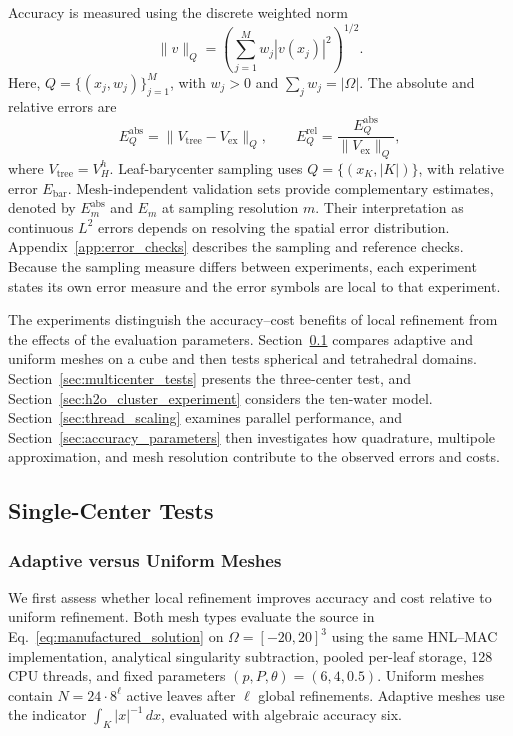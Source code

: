 \documentclass[a4paper,pdflatex,sn-mathphys-num]{sn-jnl}
\theoremstyle{thmstyleone}
\begin{document}
Accuracy is measured using the discrete weighted norm
\[
\|v\|_Q=\left(\sum_{j=1}^{M}w_j|v(x_j)|^2\right)^{1/2}.
\]
Here, $Q=\{(x_j,w_j)\}_{j=1}^{M}$, with $w_j>0$ and $\sum_jw_j=|\Omega|$. The absolute and relative errors are
\begin{equation}
\label{eq:sampled_error_measures}
E_Q^{\mathrm{abs}}=\|V_{\mathrm{tree}}-V_{\mathrm{ex}}\|_Q,
\qquad
E_Q^{\mathrm{rel}}=\frac{E_Q^{\mathrm{abs}}}{\|V_{\mathrm{ex}}\|_Q},
\end{equation}
where $V_{\mathrm{tree}}=V_H^h$. Leaf-barycenter sampling uses $Q=\{(x_K,|K|)\}$, with relative error $E_{\mathrm{bar}}$. Mesh-independent validation sets provide complementary estimates, denoted by $E_m^{\mathrm{abs}}$ and $E_m$ at sampling resolution $m$. Their interpretation as continuous $L^2$ errors depends on resolving the spatial error distribution. Appendix~\ref{app:error_checks} describes the sampling and reference checks. Because the sampling measure differs between experiments, each experiment states its own error measure and the error symbols are local to that experiment.

The experiments distinguish the accuracy--cost benefits of local refinement from the effects of the evaluation parameters. Section~\ref{sec:single_center_tests} compares adaptive and uniform meshes on a cube and then tests spherical and tetrahedral domains. Section~\ref{sec:multicenter_tests} presents the three-center test, and Section~\ref{sec:h2o_cluster_experiment} considers the ten-water model. Section~\ref{sec:thread_scaling} examines parallel performance, and Section~\ref{sec:accuracy_parameters} then investigates how quadrature, multipole approximation, and mesh resolution contribute to the observed errors and costs.

\subsection{Single-Center Tests}
\label{sec:single_center_tests}

\subsubsection{Adaptive versus Uniform Meshes}
\label{sec:adaptive_uniform}

We first assess whether local refinement improves accuracy and cost relative to uniform refinement. Both mesh types evaluate the source in Eq.~\eqref{eq:manufactured_solution} on $\Omega=[-20,20]^3$ using the same HNL--MAC implementation, analytical singularity subtraction, pooled per-leaf storage, 128 CPU threads, and fixed parameters $(p,P,\theta)=(6,4,0.5)$. Uniform meshes contain $N=24\cdot8^\ell$ active leaves after $\ell$ global refinements. Adaptive meshes use the indicator $\int_K|x|^{-1}\,dx$, evaluated with algebraic accuracy six.
\end{document}
